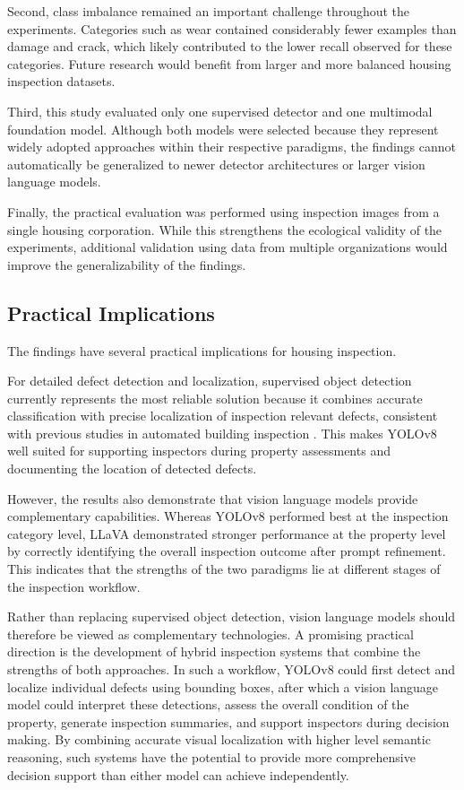 Second, class imbalance remained an important challenge throughout the experiments. Categories such as wear contained considerably fewer examples than damage and crack, which likely contributed to the lower recall observed for these categories. Future research would benefit from larger and more balanced housing inspection datasets.

Third, this study evaluated only one supervised detector and one multimodal foundation model. Although both models were selected because they represent widely adopted approaches within their respective paradigms, the findings cannot automatically be generalized to newer detector architectures or larger vision language models.

Finally, the practical evaluation was performed using inspection images from a single housing corporation. While this strengthens the ecological validity of the experiments, additional validation using data from multiple organizations would improve the generalizability of the findings.

\subsection{Practical Implications}

The findings have several practical implications for housing inspection.

For detailed defect detection and localization, supervised object detection currently represents the most reliable solution because it combines accurate classification with precise localization of inspection relevant defects, consistent with previous studies in automated building inspection \cite{kang_improvement_2025}. This makes YOLOv8 well suited for supporting inspectors during property assessments and documenting the location of detected defects.

However, the results also demonstrate that vision language models provide complementary capabilities. Whereas YOLOv8 performed best at the inspection category level, LLaVA demonstrated stronger performance at the property level by correctly identifying the overall inspection outcome after prompt refinement. This indicates that the strengths of the two paradigms lie at different stages of the inspection workflow.

Rather than replacing supervised object detection, vision language models should therefore be viewed as complementary technologies. A promising practical direction is the development of hybrid inspection systems that combine the strengths of both approaches. In such a workflow, YOLOv8 could first detect and localize individual defects using bounding boxes, after which a vision language model could interpret these detections, assess the overall condition of the property, generate inspection summaries, and support inspectors during decision making. By combining accurate visual localization with higher level semantic reasoning, such systems have the potential to provide more comprehensive decision support than either model can achieve independently.

